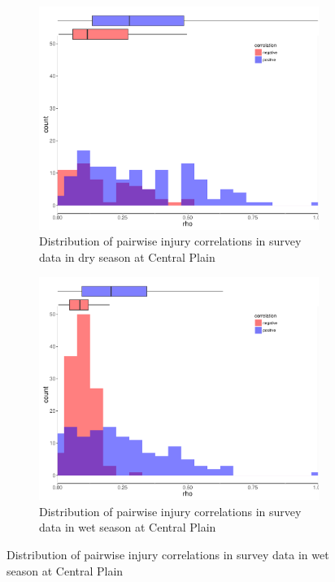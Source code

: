 \begin{figure}
   \begin{subfigure}[b]{0.5\textwidth}
        \includegraphics[width = \textwidth]{figures/combinedplotCP_ds.pdf}
        \caption{Distribution of pairwise injury correlations in survey data in dry season at Central Plain}
        \label{fig:}
    \end{subfigure}
    \begin{subfigure}[b]{0.5\textwidth}
        \includegraphics[width = \textwidth]{figures/combinedplotCP_ws.pdf}
        \caption{Distribution of pairwise injury correlations in survey data in wet season at Central Plain}

\end{subfigure}
\end{figure}
